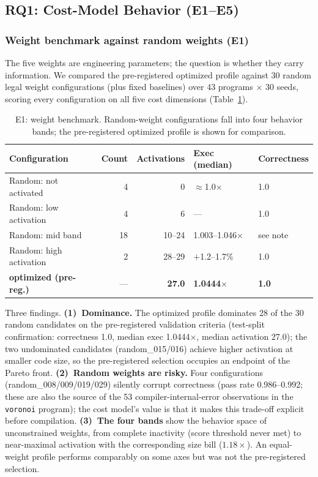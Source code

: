 \documentclass[5p,times,authoryear]{elsarticle}
\theoremstyle{plain}
\theoremstyle{definition}
\theoremstyle{remark}
\begin{document}
\subsection{RQ1: Cost-Model Behavior (E1--E5)}

\subsubsection{Weight benchmark against random weights (E1)}
The five weights are engineering parameters; the question is whether they carry
information. We compared the pre-registered optimized profile against 30 random legal
weight configurations (plus fixed baselines) over 43 programs $\times$ 30 seeds,
scoring every configuration on all five cost dimensions (Table~\ref{tab:e1_weights}).

\begin{table}[!t]
\centering
\footnotesize
\caption{E1: weight benchmark. Random-weight configurations fall into four behavior
bands; the pre-registered optimized profile is shown for comparison.}
\label{tab:e1_weights}
\begin{tabular}{lrrll}
\toprule
Configuration & Count & Activations & Exec (median) & Correctness \\
\midrule
Random: not activated & 4 & 0 & $\approx$1.0$\times$ & 1.0 \\
Random: low activation & 4 & 6 & --- & 1.0 \\
Random: mid band & 18 & 10--24 & 1.003--1.046$\times$ & see note \\
Random: high activation & 2 & 28--29 & $+$1.2--1.7\% & 1.0 \\
\textbf{optimized (pre-reg.)} & --- & \textbf{27.0} & \textbf{1.0444$\times$} & \textbf{1.0} \\
\bottomrule
\end{tabular}
\end{table}

Three findings. \textbf{(1)~Dominance.} The optimized profile dominates 28 of the 30
random candidates on the pre-registered validation criteria (test-split confirmation:
correctness 1.0, median exec 1.0444$\times$, median activation 27.0); the two
undominated candidates (random\_015/016) achieve higher activation at smaller code
size, so the pre-registered selection occupies an endpoint of the Pareto front.
\textbf{(2)~Random weights are risky.} Four configurations (random\_008/009/019/029)
silently corrupt correctness (pass rate 0.986--0.992; these are also the source of the
53 compiler-internal-error observations in the \texttt{voronoi} program); the cost
model's value is that it makes this trade-off explicit before compilation.
\textbf{(3)~The four bands} show the behavior space of unconstrained weights, from
complete inactivity (score threshold never met) to near-maximal activation with the
corresponding size bill ($1.18\times$). An equal-weight profile performs comparably
on some axes but was not the pre-registered selection.
\end{document}
